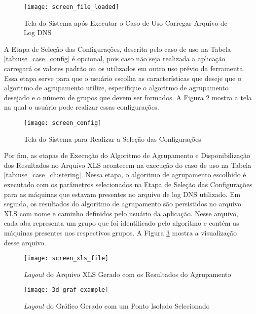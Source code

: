 \begin{figure}
\centering
\texttt{[image: screen\_file\_loaded]}
\caption[Tela do Sistema após Executar o Caso de Uso Carregar Arquivo de Log DNS]{Tela do Sistema após Executar o Caso de Uso Carregar Arquivo de Log DNS} \label{fig:screen_file_loaded}
\end{figure}

A Etapa de Seleção das Configurações, descrita pelo caso de uso na Tabela \ref{tab:use_case_config} é opcional, pois caso não seja realizada a aplicação carregará os valores padrão ou os utilizados em outro uso prévio da ferramenta. Essa etapa serve para que o usuário escolha as características que deseje que o algoritmo de agrupamento utilize, especifique o algoritmo de agrupamento desejado e o número de grupos que devem ser formados. A Figura \ref{fig:screen_config} mostra a tela na qual o usuário pode realizar essas configurações.

\begin{figure}
\centering
\texttt{[image: screen\_config]}
\caption[Tela do Sistema para Realizar a Seleção das Configurações]{Tela do Sistema para Realizar a Seleção das Configurações} \label{fig:screen_config}
\end{figure}

Por fim, as etapas de Execução do Algoritmo de Agrupamento e Disponibilização dos Resultados no Arquivo XLS acontecem na execução do caso de uso na Tabela \ref{tab:use_case_clustering}. Nessa etapa, o algoritmo de agrupamento escolhido é executado com os parâmetros selecionados na Etapa de Seleção das Configurações para as máquinas que estavam presentes no arquivo de log DNS utilizado. Em seguida, os resultados do algoritmo de agrupamento são persistidos no arquivo XLS com nome e caminho definidos pelo usuário da aplicação. Nesse arquivo, cada aba representa um grupo que foi identificado pelo algoritmo e contém as máquinas presentes nos respectivos grupos. A Figura \ref{fig:screen_xls_file} mostra a visualização desse arquivo.

\begin{figure}
\centering
\texttt{[image: screen\_xls\_file]}
\caption[\textit{Layout} do Arquivo XLS Gerado com os Resultados do Agrupamento]{\textit{Layout} do Arquivo XLS Gerado com os Resultados do Agrupamento} \label{fig:screen_xls_file}
\end{figure}

\begin{figure}
\centering
\texttt{[image: 3d\_graf\_example]}
\caption[\textit{Layout}  do Gráfico Gerado com um Ponto Isolado Selecionado]{\textit{Layout}  do Gráfico Gerado com um Ponto Isolado Selecionado} \label{fig:3d_graf_example}
\end{figure}


